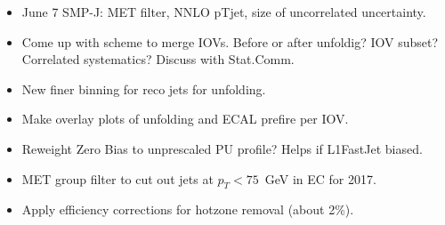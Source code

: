 \documentclass[landscape,10pt]{beamer} %
\begin{document}
\begin{itemize}
\item June 7 SMP-J: MET filter, NNLO pTjet, size of uncorrelated uncertainty.
\item Come up with scheme to merge IOVs. Before or after unfoldig? IOV subset? Correlated systematics? Discuss with Stat.Comm.
\item New finer binning for reco jets for unfolding.
\item Make overlay plots of unfolding and ECAL prefire per IOV.
\item Reweight Zero Bias to unprescaled PU profile? Helps if L1FastJet biased.
\item MET group filter to cut out jets at $p_T<75$~GeV in EC for 2017.
\item Apply efficiency corrections for hotzone removal (about 2\%).
\end{itemize}
\end{document}
